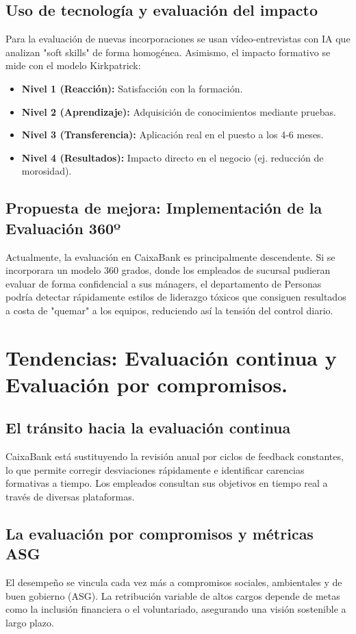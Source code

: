 \subsection{Uso de tecnología y evaluación del impacto}
Para la evaluación de nuevas incorporaciones se usan vídeo-entrevistas con IA que analizan "soft skills" de forma homogénea. Asimismo, el impacto formativo se mide con el modelo Kirkpatrick:
\begin{itemize}[leftmargin=*]
    \item \textbf{Nivel 1 (Reacción):} Satisfacción con la formación.
    \item \textbf{Nivel 2 (Aprendizaje):} Adquisición de conocimientos mediante pruebas.
    \item \textbf{Nivel 3 (Transferencia):} Aplicación real en el puesto a los 4-6 meses.
    \item \textbf{Nivel 4 (Resultados):} Impacto directo en el negocio (ej. reducción de morosidad).
\end{itemize}

\subsection*{Propuesta de mejora: Implementación de la Evaluación 360º}
Actualmente, la evaluación en CaixaBank es principalmente descendente. Si se incorporara un modelo 360 grados, donde los empleados de sucursal pudieran evaluar de forma confidencial a sus mánagers, el departamento de Personas podría detectar rápidamente estilos de liderazgo tóxicos que consiguen resultados a costa de "quemar" a los equipos, reduciendo así la tensión del control diario.

\section{Tendencias: Evaluación continua y Evaluación por compromisos.}  

\subsection{El tránsito hacia la evaluación continua}
CaixaBank está sustituyendo la revisión anual por ciclos de feedback constantes, lo que permite corregir desviaciones rápidamente e identificar carencias formativas a tiempo. Los empleados consultan sus objetivos en tiempo real a través de diversas plataformas.

\subsection{La evaluación por compromisos y métricas ASG}
El desempeño se vincula cada vez más a compromisos sociales, ambientales y de buen gobierno (ASG). La retribución variable de altos cargos depende de metas como la inclusión financiera o el voluntariado, asegurando una visión sostenible a largo plazo.

